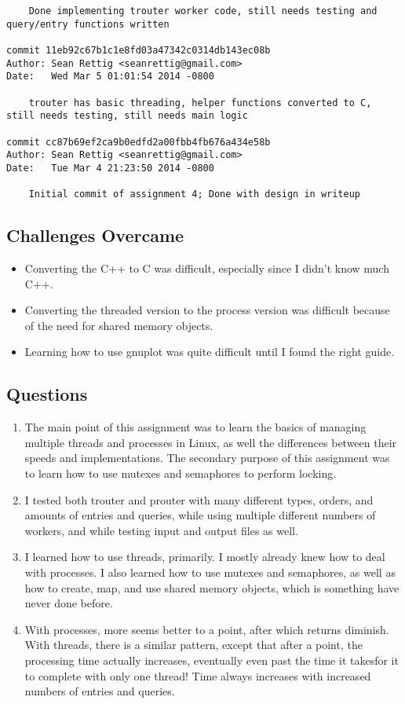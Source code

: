 \documentclass[letterpaper,10pt,fleqn]{article}
\numberwithin{equation}{section}
\begin{document}
\begin{verbatim}
    Done implementing trouter worker code, still needs testing and query/entry functions written

commit 11eb92c67b1c1e8fd03a47342c0314db143ec08b
Author: Sean Rettig <seanrettig@gmail.com>
Date:   Wed Mar 5 01:01:54 2014 -0800

    trouter has basic threading, helper functions converted to C, still needs testing, still needs main logic

commit cc87b69ef2ca9b0edfd2a00fbb4fb676a434e58b
Author: Sean Rettig <seanrettig@gmail.com>
Date:   Tue Mar 4 21:23:50 2014 -0800

    Initial commit of assignment 4; Done with design in writeup
\end{verbatim}
\subsection*{Challenges Overcame}
\begin{itemize}
    \item Converting the C++ to C was difficult, especially since I didn't know much C++.
    \item Converting the threaded version to the process version was difficult because of the need for shared memory objects.
    \item Learning how to use gnuplot was quite difficult until I found the right guide.
\end{itemize}

\subsection*{Questions}
\begin{enumerate}
    \item The main point of this assignment was to learn the basics of managing multiple threads and processes in Linux, as well the differences between their speeds and implementations.  The secondary purpose of this assignment was to learn how to use mutexes and semaphores to perform locking.
    \item I tested both trouter and prouter with many different types, orders, and amounts of entries and queries, while using multiple different numbers of workers, and while testing input and output files as well.
    \item I learned how to use threads, primarily.  I mostly already knew how to deal with processes.  I also learned how to use mutexes and semaphores, as well as how to create, map, and use shared memory objects, which is something  have never done before.
    \item With processes, more seems better to a point, after which returns diminish.  With threads, there is a similar pattern, except that after a point, the processing time actually increases, eventually even past the time it takesfor it to complete with only one thread!  Time always increases with increased numbers of entries and queries.
\end{enumerate}
\end{document}
